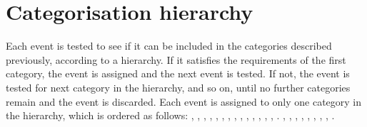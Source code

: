\section{Categorisation hierarchy}
\label{cat:sec:hierarchy}

Each event is tested to see if it can be included in the categories described previously, according to a hierarchy. If it satisfies the requirements of the first category, the event is assigned and the next event is tested. If not, the event is tested for next category in the hierarchy, and so on, until no further categories remain and the event is discarded. Each event is assigned to only one category in the hierarchy, which is ordered as follows: 
\ifNewAnalysis
\TTHLeptonicTag, \WHLeptonicTag, \ZHLeptonicTag, \VHLeptonicLooseTag, \VHMetTag, \TTHHadronicTag, \VHHadronicTag, , , , , , , , .
\else
\TTHLeptonicTag, \TTHHadronicTag, \VHHadronicTag, , , , , , .
\fi
